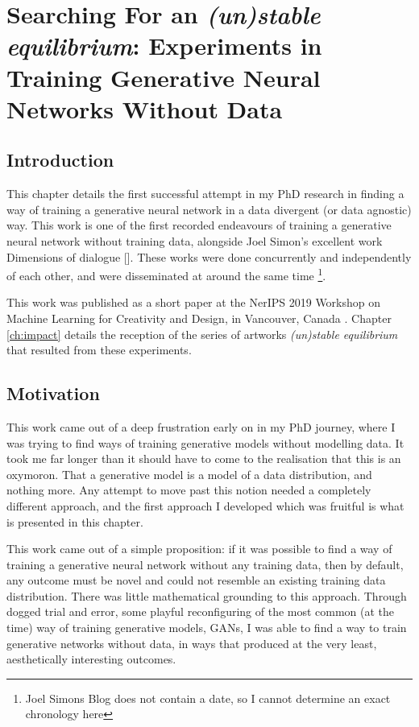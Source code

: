 \chapter{Searching For an \textit{(un)stable equilibrium}:
Experiments in Training Generative Neural Networks Without Data}
\label{ch:unstable_eq}

\section{Introduction}

This chapter details the first successful attempt in my PhD research in finding a way of training a generative neural network in a data divergent (or data agnostic) way. 
This work is one of the first recorded endeavours of training a generative neural network without training data, alongside Joel Simon’s excellent work Dimensions of dialogue [\citeyear{simon2019dimensions}]. 
These works were done concurrently and independently of each other, and were disseminated at around the same time \footnote{Joel Simons Blog does not contain a date, so I cannot determine an exact chronology here}. 

This work was published as a short paper at the NerIPS 2019 Workshop on Machine Learning for Creativity and Design, in Vancouver, Canada \citep{broad2019searching}. 
Chapter \ref{ch:impact} details the reception of the series of artworks \textit{(un)stable equilibrium} that resulted from these experiments. 

\section{Motivation}

This work came out of a deep frustration early on in my PhD journey, where I was trying to find ways of training generative models without modelling data.
It took me far longer than it should have to come to the realisation that this is an oxymoron. 
That a generative model is a model of a data distribution, and nothing more. 
Any attempt to move past this notion needed a completely different approach, and the first approach I developed which was fruitful is what is presented in this chapter. 

This work came out of a simple proposition: if it was possible to find a way of training a generative neural network without any training data, then by default, any outcome must be novel and could not resemble an existing training data distribution. 
There was little mathematical grounding to this approach. 
Through dogged trial and error, some playful reconfiguring of the most common (at the time) way of training generative models, GANs, I was able to find a way to train generative networks without data, in ways that produced at the very least, aesthetically interesting outcomes. 

